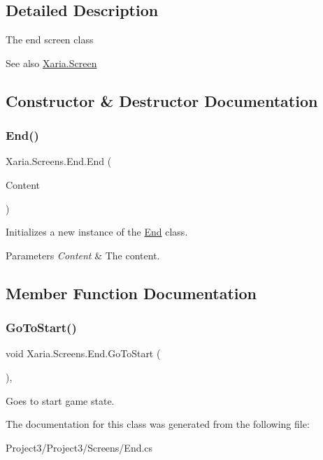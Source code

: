 \subsection{Detailed Description}
The end screen class 

\begin{DoxySeeAlso}{See also}
\hyperlink{classXaria_1_1Screen}{Xaria.\+Screen}


\end{DoxySeeAlso}


\subsection{Constructor \& Destructor Documentation}
\mbox{\label{classXaria_1_1Screens_1_1End_a0d726b82ca97ef400e01b3cf04d9a2ed}} 
\subsubsection{\texorpdfstring{End()}{End()}}
{\footnotesize\ttfamily Xaria.\+Screens.\+End.\+End (\begin{DoxyParamCaption}\item[{Content\+Manager}]{Content }\end{DoxyParamCaption})\hspace{0.3cm}{\ttfamily [inline]}}



Initializes a new instance of the \hyperlink{classXaria_1_1Screens_1_1End}{End} class. 


\begin{DoxyParams}{Parameters}
{\em Content} & The content.\\
\hline
\end{DoxyParams}


\subsection{Member Function Documentation}
\mbox{\label{classXaria_1_1Screens_1_1End_ac0a776c1ec2fd230c497cd1eebf4a2de}} 
\subsubsection{\texorpdfstring{Go\+To\+Start()}{GoToStart()}}
{\footnotesize\ttfamily void Xaria.\+Screens.\+End.\+Go\+To\+Start (\begin{DoxyParamCaption}{ }\end{DoxyParamCaption})\hspace{0.3cm}{\ttfamily [inline]}, {\ttfamily [private]}}



Goes to start game state. 



The documentation for this class was generated from the following file\+:\begin{DoxyCompactItemize}
\item 
Project3/\+Project3/\+Screens/End.\+cs\end{DoxyCompactItemize}
